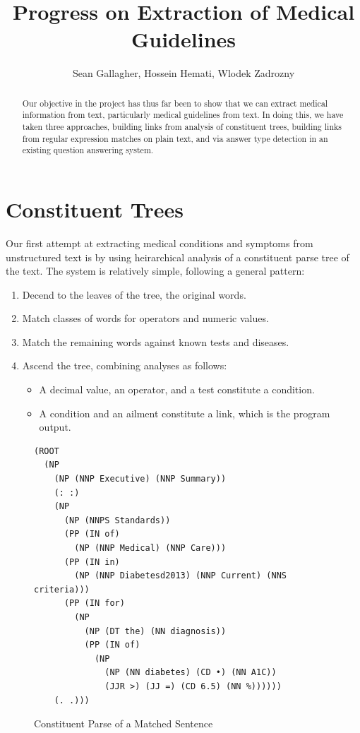 \documentclass[12pt,letterpaper]{article}
\author{Sean Gallagher, Hossein Hemati, Wlodek Zadrozny}
\title{Progress on Extraction of Medical Guidelines}
\begin{document}
\maketitle
\begin{abstract}
Our objective in the project has thus far been to show that we can extract medical information from text, particularly medical guidelines from text. In doing this, we have taken three approaches, building links from analysis of constituent trees, building links from regular expression matches on plain text, and via answer type detection in an existing question answering system.
\end{abstract}
\section{Constituent Trees}
Our first attempt at extracting medical conditions and symptoms from unstructured text is by using heirarchical analysis of a constituent parse tree of the text. The system is relatively simple, following a general pattern:

\begin{enumerate}
\item Decend to the leaves of the tree, the original words.
\item Match classes of words for operators and numeric values.
\item Match the remaining words against known tests and diseases.
\item Ascend the tree, combining analyses as follows:
\begin{itemize}
	\item A decimal value, an operator, and a test constitute a condition.
	\item A condition and an ailment constitute a link, which is the program output.
\end{itemize}
\end{enumerate}

\begin{figure}
\footnotesize
\begin{verbatim}
(ROOT
  (NP
    (NP (NNP Executive) (NNP Summary))
    (: :)
    (NP
      (NP (NNPS Standards))
      (PP (IN of)
        (NP (NNP Medical) (NNP Care)))
      (PP (IN in)
        (NP (NNP Diabetesd2013) (NNP Current) (NNS criteria)))
      (PP (IN for)
        (NP
          (NP (DT the) (NN diagnosis))
          (PP (IN of)
            (NP
              (NP (NN diabetes) (CD •) (NN A1C))
              (JJR >) (JJ =) (CD 6.5) (NN %))))))
    (. .)))
\end{verbatim}
\caption{Constituent Parse of a Matched Sentence}
\end{figure}
\end{document}
